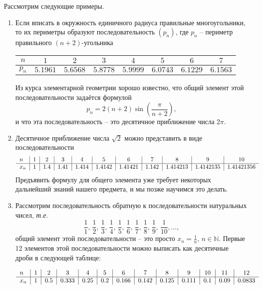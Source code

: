 \begin{example}
Рассмотрим следующие примеры.
    \begin{enumerate}
        \item Если вписать в окружность единичного радиуса правильные многоугольники, то их периметры образуют последовательность $(p_n)$, где $p_n$ -- периметр правильного $(n+2)$-угольника
        \begin{center}
            \begin{tabular}{c|c|c|c|c|c|c|c}
                $n$ & $1$ &  $2$ & $3$     & $4$  & $5$ & $6$ & $7$  \\ \hline
                $p_n$ & $5.1961$ & $5.6568$ & $5.8778$ & $5.9999$ & $6.0743$ & $6.1229$ & $6.1563$
            \end{tabular}
        \end{center}
        Из курса элементарной геометрии хорошо известно, что общий элемент этой последовательности задаётся формулой
        \[
         p_n = 2(n+2)\sin\left(\frac{\pi}{n+2}\right),
        \]
        и что эта последовательность -- это десятичное приближение числа $2\pi.$
     \item Десятичное приближение числа $\sqrt{2}$ можно представить в виде последовательности
    \[
    \begin{tabular}{l|c|c|c|c|c|c|c|c|c|c}
      $n$ & 1&2&3&4&5&6&7&8&9&10\\
       \hline
     $x_n$&  1 & 1.4 & 1.41 & 1.414 & 1.4142 & 1.41421 & 1.142& 1.414213 & 1.4142135 & 1.41421356
         \end{tabular}
    \]
    Предъявить формулу для общего элемента уже требует некоторых дальнейший знаний нашего предмета, и мы позже научимся это делать.

    \item Рассмотрим последовательность обратную к последовательности натуральных чисел, \textit{т.е.}
    \[
      \frac{1}{1}, \,\frac{1}{2}, \,\frac{1}{3}, \, \frac{1}{4}, \, \frac{1}{5}, \, \frac{1}{6},\, \frac{1}{7},\, \frac{1}{8},\, \frac{1}{9},\, \frac{1}{10},  \ldots,
    \]
    общий элемент этой последовательности -- это просто $x_n = \frac{1}{n}$, $n \in \mathbb{N}.$ Первые 12 элементов этой последовательности можно выписать как десятичные дроби в следующей таблице:

        \[
         \begin{tabular}{l|c|c|c|c|c|c|c|c|c|c|c|c}
             $n$ & 1&2&3&4&5&6&7&8&9&10&11&12  \\
             \hline
             $x_n$&  1 & 0.5 & 0.333 & 0.25 & 0.2 & 0.166 & 0.142& 0.125 & 0.111 & 0.1 & 0.09 & 0.0833
         \end{tabular}
        \]


\end{enumerate}
\end{example}
